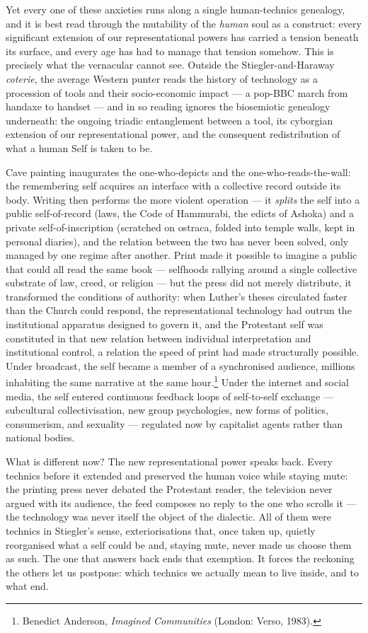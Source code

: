 Yet every one of these anxieties runs along a single human-technics genealogy, and it is best read through the mutability of the \textit{human} soul as a construct: every significant extension of our representational powers has carried a tension beneath its surface, and every age has had to manage that tension somehow. This is precisely what the vernacular cannot see. Outside the Stiegler-and-Haraway \textit{coterie}, the average Western punter reads the history of technology as a procession of tools and their socio-economic impact --- a pop-BBC march from handaxe to handset --- and in so reading ignores the biosemiotic genealogy underneath: the ongoing triadic entanglement between a tool, its cyborgian extension of our representational power, and the consequent redistribution of what a human Self is taken to be.

Cave painting inaugurates the one-who-depicts and the one-who-reads-the-wall: the remembering self acquires an interface with a collective record outside its body. Writing then performs the more violent operation --- it \textit{splits} the self into a public self-of-record (laws, the Code of Hammurabi, the edicts of Ashoka) and a private self-of-inscription (scratched on ostraca, folded into temple walls, kept in personal diaries), and the relation between the two has never been solved, only managed by one regime after another. Print made it possible to imagine a public that could all read the same book --- selfhoods rallying around a single collective substrate of law, creed, or religion --- but the press did not merely distribute, it transformed the conditions of authority: when Luther's theses circulated faster than the Church could respond, the representational technology had outrun the institutional apparatus designed to govern it, and the Protestant self was constituted in that new relation between individual interpretation and institutional control, a relation the speed of print had made structurally possible. Under broadcast, the self became a member of a synchronised audience, millions inhabiting the same narrative at the same hour.\footnote{Benedict Anderson, \emph{Imagined Communities} (London: Verso, 1983).} Under the internet and social media, the self entered continuous feedback loops of self-to-self exchange --- subcultural collectivisation, new group psychologies, new forms of politics, consumerism, and sexuality --- regulated now by capitalist agents rather than national bodies.

What is different now? The new representational power speaks back. Every technics before it extended and preserved the human voice while staying mute: the printing press never debated the Protestant reader, the television never argued with its audience, the feed composes no reply to the one who scrolls it --- the technology was never itself the object of the dialectic. All of them were technics in Stiegler's sense, exteriorisations that, once taken up, quietly reorganised what a self could be and, staying mute, never made us choose them as such. The one that answers back ends that exemption. It forces the reckoning the others let us postpone: which technics we actually mean to live inside, and to what end.

